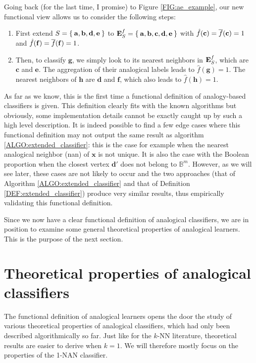 Going back (for the last time, I promise) to Figure \ref{FIG:ae_example}, our
new functional view allows us to consider the following steps:
\begin{enumerate}
  \item First extend $S = \Set{\mathbf{a}, \mathbf{b}, \mathbf{d}, \mathbf{e}}$
    to $\mathbf{E}_{S}^{f} = \Set{\mathbf{a}, \mathbf{b}, \mathbf{c}, \mathbf{d},
    \mathbf{e}}$ with $\hat{f}(\mathbf{c}) = \overline{f}(\mathbf{c}) = 1$ and
    $\hat{f}(\mathbf{f}) = \overline{f}(\mathbf{f}) = 1$.
  \item Then, to classify $\mathbf{g}$, we simply look to its nearest neighbors
    in $\mathbf{E}_{S}^{f}$, which are $\mathbf{c}$ and $\mathbf{e}$. The aggregation of
    their analogical labels leads to
    $\hat{f}(\mathbf{g}) = 1$. The nearest neighbors of $\mathbf{h}$ are
    $\mathbf{d}$ and $\mathbf{f}$, which also leads to $\hat{f}(\mathbf{h}) =
    1$.
\end{enumerate}

As far as we know, this is the first time a functional definition of
analogy-based classifiers is given. This definition clearly fits with the known
algorithms but obviously, some implementation details cannot be exactly caught
up by such a high level description. It is indeed possible to find a few edge
cases where this functional definition may not output the same result as
algorithm \ref{ALGO:extended_classifier}: this is the case for example when the
nearest analogical neighbor (nan) of $\mathbf{x}$ is not unique. It is also the
case with the Boolean proportion when the closest vertex $\mathbf{d}'$ does not
belong to $\mathbb{B}^m$.  However, as we will see later, these cases are not
likely to occur and the two approaches (that of Algorithm
\ref{ALGO:extended_classifier} and that of Definition
\ref{DEF:extended_classifier}) produce very similar results, thus empirically
validating this functional definition.

Since we now have a clear functional definition of analogical classifiers, we
are in position to examine some general theoretical properties of analogical
learners. This is the purpose of the next section.
\section{Theoretical properties of analogical classifiers}
\label{sec:theoretical_properties_of_analogical_classifiers}

The functional definition of analogical learners opens the door the study of
various theoretical properties of analogical classifiers, which had only been
described algorithmically so far. Just like for the $k$-NN literature,
theoretical results are easier to derive when $k = 1$. We will therefore mostly
focus on the properties of the 1-NAN classifier.
